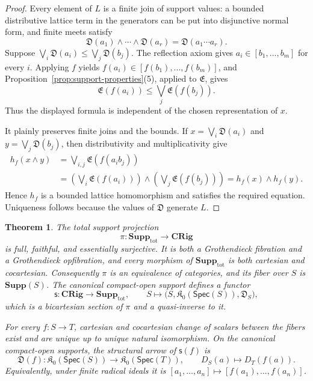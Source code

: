\documentclass[12pt,leqno]{amsart}
\newcommand{\CRig}{\mathbf{CRig}}
\newcommand{\Supp}{\mathbf{Supp}}
\newcommand{\TotSupp}{\mathbf{Supp}_{\mathrm{tot}}}
\newcommand{\Spec}{\mathsf{Spec}}
\newcommand{\KOpen}{\mathfrak K_{0}}
\newtheorem{theorem}{Theorem}[section]
\theoremstyle{definition}
\numberwithin{equation}{section}
\theoremstyle{remark}
\def\leq{\leqslant}
\begin{document}
\begin{proof}
Every element of $L$ is a finite join of support values: a bounded distributive lattice term in the generators can be put into disjunctive normal form, and finite meets satisfy
\[
\mathfrak D(a_1)\wedge\cdots\wedge\mathfrak D(a_r)
 =\mathfrak D(a_1\cdots a_r).
\]
Suppose
\(\bigvee_i\mathfrak D(a_i)\leq\bigvee_j\mathfrak D(b_j)\). The reflection axiom gives
\(a_i\in[b_1,\ldots,b_m]\) for every $i$. Applying $f$ yields
\(f(a_i)\in[f(b_1),\ldots,f(b_m)]\), and Proposition~\ref{prop:support-properties}(5), applied to $\mathfrak E$, gives
\[
\mathfrak E(f(a_i))
 \leq\bigvee_j\mathfrak E(f(b_j)).
\]
Thus the displayed formula is independent of the chosen representation of $x$.

It plainly preserves finite joins and the bounds. If
\(x=\bigvee_i\mathfrak D(a_i)\) and
\(y=\bigvee_j\mathfrak D(b_j)\), then distributivity and multiplicativity give
\begin{align*}
h_f(x\wedge y)
 &=\bigvee_{i,j}\mathfrak E(f(a_i b_j))\\
 &=\left(\bigvee_i\mathfrak E(f(a_i))\right)
   \wedge
   \left(\bigvee_j\mathfrak E(f(b_j))\right)
 =h_f(x)\wedge h_f(y).
\end{align*}
Hence $h_f$ is a bounded lattice homomorphism and satisfies the required equation. Uniqueness follows because the values of $\mathfrak D$ generate $L$.
\end{proof}

\begin{theorem}\label{thm:support-bifibration}
The total support projection
\[
\pi\colon\TotSupp\longrightarrow\CRig
\]
is full, faithful, and essentially surjective. It is both a Grothendieck fibration and a Grothendieck opfibration, and every morphism of \(\TotSupp\) is both cartesian and cocartesian. Consequently $\pi$ is an equivalence of categories, and its fiber over $S$ is \(\Supp(S)\). The canonical compact-open support defines a functor
\[
\mathsf s\colon\CRig\longrightarrow\TotSupp,
\qquad
S\longmapsto\bigl(S,\KOpen(\Spec(S)),\mathfrak D_S\bigr),
\]
which is a bicartesian section of $\pi$ and a quasi-inverse to it.

For every \(f\colon S\to T\), cartesian and cocartesian change of scalars between the fibers exist and are unique up to unique natural isomorphism. On the canonical compact-open supports, the structural arrow of $\mathsf s(f)$ is
\[
\mathfrak D(f)\colon\KOpen(\Spec(S))\longrightarrow\KOpen(\Spec(T)),
\qquad
D_S(a)\longmapsto D_T(f(a)).
\]
Equivalently, under finite radical ideals it is
\([a_1,\ldots,a_n]\mapsto[f(a_1),\ldots,f(a_n)]\).
\end{theorem}
\end{document}
